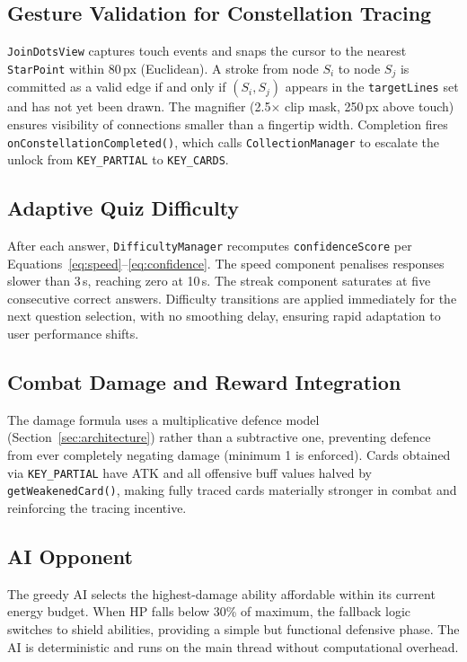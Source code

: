 \documentclass[conference]{IEEEtran}
\begin{document}
\subsection{Gesture Validation for Constellation Tracing}
\texttt{JoinDotsView} captures touch events and snaps the cursor to the nearest \texttt{StarPoint} within 80\,px (Euclidean). A stroke from node $S_i$ to node $S_j$ is committed as a valid edge if and only if $(S_i, S_j)$ appears in the \texttt{targetLines} set and has not yet been drawn. The magnifier (2.5$\times$ clip mask, 250\,px above touch) ensures visibility of connections smaller than a fingertip width. Completion fires \texttt{onConstellationCompleted()}, which calls \texttt{CollectionManager} to escalate the unlock from \texttt{KEY\_PARTIAL} to \texttt{KEY\_CARDS}.

\subsection{Adaptive Quiz Difficulty}
After each answer, \texttt{DifficultyManager} recomputes \texttt{confidenceScore} per Equations~\ref{eq:speed}--\ref{eq:confidence}. The speed component penalises responses slower than 3\,s, reaching zero at 10\,s. The streak component saturates at five consecutive correct answers. Difficulty transitions are applied immediately for the next question selection, with no smoothing delay, ensuring rapid adaptation to user performance shifts.

\subsection{Combat Damage and Reward Integration}
The damage formula uses a multiplicative defence model (Section~\ref{sec:architecture}) rather than a subtractive one, preventing defence from ever completely negating damage (minimum 1 is enforced). Cards obtained via \texttt{KEY\_PARTIAL} have ATK and all offensive buff values halved by \texttt{getWeakenedCard()}, making fully traced cards materially stronger in combat and reinforcing the tracing incentive.

\subsection{AI Opponent}
The greedy AI selects the highest-damage ability affordable within its current energy budget. When HP falls below 30\% of maximum, the fallback logic switches to shield abilities, providing a simple but functional defensive phase. The AI is deterministic and runs on the main thread without computational overhead.
\end{document}
